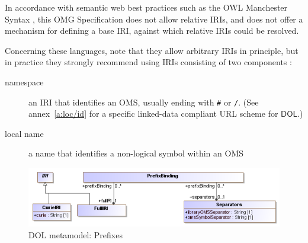\documentclass[10pt,fleqn,final]{scrreprt}
\makeatletter
\newcommand*\CommentAuthor{}
\renewcommand*\CommentAuthor{#1}}
\newcommand*\CommentDate{}
\renewcommand*\CommentDate{#1}}
\newcommand*\CommentId{}
\renewcommand*\CommentId{#1}}
\newcommand*\CommentType{}
\renewcommand*\CommentType{#1}}
\newcommand*{\SetCommentColorByType}[1]{%
\edef\localType{{#1}}%
\expandafter\ifstrequal\localType{q-aut}{\colorlet{CommentColor}{red}}{%
\expandafter\ifstrequal\localType{q-all}{\colorlet{CommentColor}{orange}}{%
\expandafter\ifstrequal\localType{todo}{\colorlet{CommentColor}{orange}}{%
\expandafter\ifstrequal\localType{fyi}{\colorlet{CommentColor}{lightgray}}{%
\colorlet{CommentColor}{yellow}}}}}}
\newcommand*{\SetCommentPrefixByType}[1]{%
\edef\localType{{#1}}%
\expandafter\@ifmtarg\localType{%
\edef\CommentPrefix{}%
}{%
\caseupper[q]{#1}%
\edef\CommentPrefix{\thestring: }%
}}
\newcommand*{\initComment}[1]{%
\setkeys{Comment}{#1}%
\SetCommentColorByType{\CommentType}%
\relax%
\SetCommentPrefixByType{\CommentType}%
\relax%
}
\newcommand*{\todonote}[2][]{%
\initComment{#1}%
\pdfcomment[author=\CommentAuthor,color=CommentColor,date=\CommentDate,id=\CommentId]{%
\CommentPrefix
#2}}
\renewcommand*{\todonote}[2][]{%
\initComment{#1}%
\ednote{\CommentPrefix #2}}
\newcommand*{\syntax}[1]{\texttt{#1}}
\newcommand*{\IS}{OMG Specification\xspace}
\newcommand*{\DOL}{\ensuremath{\mathsf{DOL}}\xspace}
\newenvironment{definitions}[0]{\medskip }{}
\makeatother
\begin{document}
\begin{definitions}


In accordance with semantic web best practices such as the OWL Manchester Syntax 
\cite{W3C:NOTE-owl2-manchester-syntax-20091027}, this \IS does not allow relative IRIs, and does 
not offer a mechanism for defining a base IRI, against which relative IRIs could be resolved.

Concerning these languages, note that they allow arbitrary IRIs in principle, but in practice they 
strongly recommend using IRIs consisting of two components \cite{W3C:NOTE-swbp-vocab-pub-20080828}:
\begin{description}
\item[namespace] an IRI that identifies an OMS,
usually ending with \syntax{\#} or \syntax{/}. ({See annex~\ref{a:loc/id} for a specific linked-data compliant URL scheme for \DOL.})
\item[local name] a name that identifies a non-logical symbol within an OMS
\end{description}

\medskip
\begin{figure}
  \centering
    \includegraphics[scale=0.47]{mof/prefixes.png}
  \caption{DOL metamodel: Prefixes}
  \label{fig:prefixes}
\end{figure}




\end{definitions}
\end{document}
